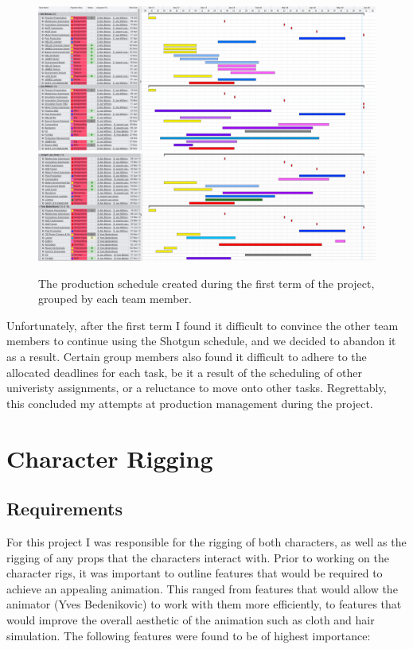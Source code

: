 \documentclass[11pt]{article}
\begin{document}
\begin{figure}[htbp]
\centering
\includegraphics[width=1.0\linewidth]{images/schedule01.png}
\includegraphics[width=1.0\linewidth]{images/schedule02.png}
\caption{\label{figure:schedule} The production schedule created during the first term of the project, grouped by each team member.}
\end{figure}

Unfortunately, after the first term I found it difficult to convince the other team members to continue using the Shotgun schedule, and we decided to abandon it as a result. Certain group members also found it difficult to adhere to the allocated deadlines for each task, be it a result of the scheduling of other univeristy assignments, or a reluctance to move onto other tasks. Regrettably, this concluded my attempts at production management during the project.

\section{Character Rigging}


\subsection{Requirements}

For this project I was responsible for the rigging of both characters, as well as the rigging of any props that the characters interact with. Prior to working on the character rigs, it was important to outline features that would be required to achieve an appealing animation. This ranged from features that would allow the animator (Yves Bedenikovic) to work with them more efficiently, to features that would improve the overall aesthetic of the animation such as cloth and hair simulation. The following features were found to be of highest importance:
\end{document}
